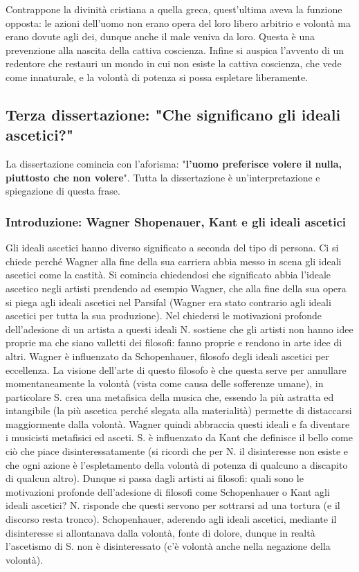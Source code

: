 \documentclass[10pt,a4paper]{article}
\begin{document}
Contrappone la divinità cristiana a quella greca, quest'ultima aveva la funzione opposta: le azioni dell'uomo non erano opera del loro libero arbitrio e volontà ma erano dovute agli dei, dunque anche il male veniva da loro. Questa è una prevenzione alla nascita della cattiva coscienza. 
Infine si auspica l'avvento di un redentore che restauri un mondo in cui non esiste la cattiva coscienza, che vede come innaturale, e la volontà di potenza si possa espletare liberamente.
\newpage
\subsection{Terza dissertazione: "Che significano gli ideali ascetici?"}
La dissertazione comincia con l'aforisma: "\textbf{l'uomo preferisce volere il nulla, piuttosto che non volere}". Tutta la dissertazione è un'interpretazione e spiegazione di questa frase.
\subsubsection{Introduzione: Wagner Shopenauer, Kant e gli ideali ascetici}
Gli ideali ascetici hanno diverso significato a seconda del tipo di persona. Ci si chiede perché Wagner alla fine della sua carriera abbia messo in scena gli ideali ascetici come la castità. Si comincia chiedendosi che significato abbia l'ideale ascetico negli artisti prendendo ad esempio Wagner, che alla fine della sua opera si piega agli ideali ascetici nel Parsifal (Wagner era stato contrario agli ideali ascetici per tutta la sua produzione). Nel chiedersi le motivazioni profonde dell'adesione di un artista a questi ideali N. sostiene che gli artisti non hanno idee proprie ma che siano valletti dei filosofi: fanno proprie e rendono in arte idee di altri. Wagner è influenzato da Schopenhauer, filosofo degli ideali ascetici per eccellenza. La visione dell'arte di questo filosofo è che questa serve per annullare momentaneamente la volontà (vista come causa delle sofferenze umane), in particolare S. crea una metafisica della musica che, essendo la più astratta ed intangibile (la più ascetica perché slegata alla materialità) permette di distaccarsi maggiormente dalla volontà. Wagner quindi abbraccia questi ideali e fa diventare i musicisti metafisici ed asceti.  S. è influenzato da Kant che definisce il bello come ciò che piace disinteressatamente (si ricordi che per N. il disinteresse non esiste e che ogni azione è l'espletamento della volontà di potenza di qualcuno a discapito di qualcun altro). Dunque si passa dagli artisti ai filosofi: quali sono le motivazioni profonde dell'adesione di filosofi come Schopenhauer o Kant agli ideali ascetici? N. risponde che questi servono per sottrarsi ad una tortura (e il discorso resta tronco). Schopenhauer, aderendo agli ideali ascetici, mediante il disinteresse si allontanava dalla volontà, fonte di dolore, dunque in realtà l'ascetismo di S. non è disinteressato (c'è volontà anche nella negazione della volontà).
\end{document}
